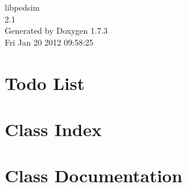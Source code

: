 \documentclass[a4paper]{article}
\begin{document}
\hypersetup{pageanchor=false}
\begin{titlepage}
\vspace*{7cm}
\begin{center}
{\Large libpedsim \\[1ex]\large 2.1 }\\
\vspace*{1cm}
{\large Generated by Doxygen 1.7.3}\\
\vspace*{0.5cm}
{\small Fri Jan 20 2012 09:58:25}\\
\end{center}
\end{titlepage}
\tableofcontents
{}
\hypersetup{pageanchor=true}
\section{Todo List}
\label{todo}
\hypertarget{todo}{}

\section{Class Index}

\section{Class Documentation}





\printindex
\end{document}
